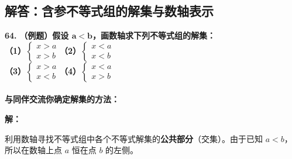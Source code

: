 \newpage

\newpage

\subsection{解答：含参不等式组的解集与数轴表示}

\vspace{0.6cm}

\textbf{\LARGE 64.} \textbf{（例题）假设 $\boldsymbol{a < b}$，画数轴求下列不等式组的解集：\\[1.5ex]
（1）$\begin{cases} x > a \\ x > b \end{cases}$\qquad\qquad （2）$\begin{cases} x < a \\ x < b \end{cases}$\\[1.5ex]
（3）$\begin{cases} x > a \\ x < b \end{cases}$\qquad\qquad （4）$\begin{cases} x < a \\ x > b \end{cases}$\\
\vspace{0.3cm}\\
与同伴交流你确定解集的方法：\underline{\hspace{8cm}}}

\vspace{0.4cm}
\textbf{解：}

利用数轴寻找不等式组中各个不等式解集的\textbf{公共部分}（交集）。由于已知 $a < b$，所以在数轴上点 $a$ 恒在点 $b$ 的左侧。

\vspace{0.4cm}

